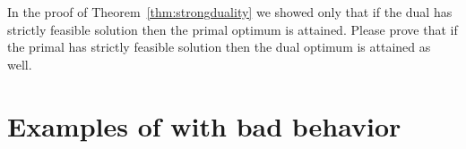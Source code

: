 \documentclass[a4paper,twoside,justified]{tufte-handout}
\begin{document}
\begin{exercise}
  In the proof of Theorem~\ref{thm:strongduality} we showed only that
  if the dual has strictly feasible solution then the primal optimum
  is attained. Please prove that if the primal has strictly feasible
  solution then the dual optimum is attained as well.
\end{exercise}

\section{Examples of \sdp with bad behavior}






\end{document}
